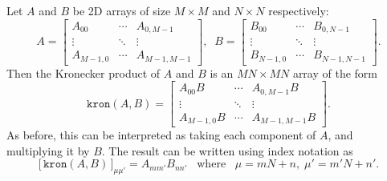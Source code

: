 \documentclass[pra,12pt]{revtex4}
\begin{document}
Let $A$ and $B$ be 2D arrays of size $M\times M$ and $N\times N$
respectively:
\begin{equation}
  A = \begin{bmatrix}A_{00} & \cdots & A_{0,M-1} \\ \vdots & \ddots & \vdots \\ A_{M-1,0} & \cdots & A_{M-1,M-1} \end{bmatrix}, \;\;
  B = \begin{bmatrix}B_{00} & \cdots & B_{0,N-1} \\ \vdots & \ddots & \vdots \\  B_{N-1,0} & \cdots & B_{N-1,N-1} \end{bmatrix}.
\end{equation}
Then the Kronecker product of $A$ and $B$ is an $MN\times MN$ array of
the form
\begin{equation}
  \texttt{kron}(A,B) = \begin{bmatrix} A_{00}B & \cdots & A_{0,M-1}B \\ \vdots & \ddots & \vdots \\ A_{M-1,0}B & \cdots & A_{M-1,M-1}B\end{bmatrix}.
    \label{kronAB_explicit}
\end{equation}
As before, this can be interpreted as taking each component of $A$,
and multiplying it by $B$.  The result can be written using index
notation as
\begin{equation}
  \big[\,\texttt{kron}(A,B)\,\big]_{\mu\mu'} = A_{mm'} B_{nn'}\;\;\;\mathrm{where}\;\;\;\mu = mN+n, \; \mu' = m'N+n'.
  \label{kronAB}
\end{equation}
\end{document}
